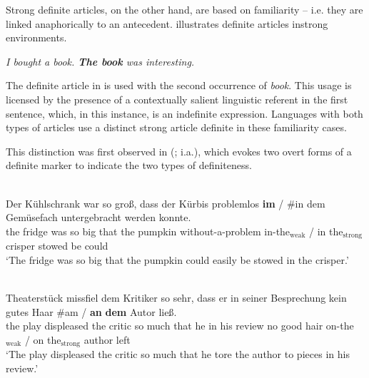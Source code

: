 \documentclass[output=paper,
modfonts
]{langscibook}
\begin{document}
Strong definite articles, on the other hand, are based on familiarity -- i.e. they are linked anaphorically to an antecedent.  illustrates definite articles in\linebreak strong environments. 

\begin{exe}
\ex \label{ex:irani:13} \textit{I bought a book. \textbf{The book} was interesting.}
\end{exe}

The definite article in  is used with the second occurrence of \textit{book}. This usage is licensed by the presence of a contextually salient linguistic referent in the first sentence, which, in this instance, is an indefinite expression. Languages with both types of articles use a distinct strong article definite in these familiarity cases. 

This distinction was first observed in  (\citealt{Heinrichs1954,Hartmann1982,Schwarz2009}; i.a.), which evokes two overt forms of a definite marker to indicate the two types of definiteness.

\begin{exe} 
\ex \label{ex:irani:14}  \citep[52]{Schwarz2009} \\
\gll Der {K{\"u}hlschrank} {war} {so} {gro{\ss}}, {dass} {der} {K{\"u}rbis} {problemlos}
{\textbf{im}} \textnormal{/} \textnormal{\#}{in} {dem} {Gem{\"u}sefach} {untergebracht} {werden} {konnte}.\\
the fridge was so big that the pumpkin without-a-problem in-the$_\text{weak}$ / \phantom{\#}in the$_\text{strong}$ crisper stowed be could\\
\trans `The fridge was so big that the pumpkin could easily be stowed in the crisper.’ 


\ex \label{ex:irani:15}  \citep[53]{Schwarz2009}\\  {Theaterst{\"u}ck} {missfiel} {dem} {Kritiker} {so} {sehr}, {dass} {er} {in} {seiner} {Besprechung} {kein} {gutes} {Haar} \textnormal{\#}{am} \textnormal{/} {\textbf{an}} {\textbf{dem}} {Autor} {ließ}.\\
the play displeased the critic so much that he in his review no good hair \phantom{\#}on-the$_\text{weak}$ / on the$_\text{strong}$ author left\\
\trans `The play displeased the critic so much that he tore the author to pieces in his review.’ 

\end{exe} 
\end{document}
